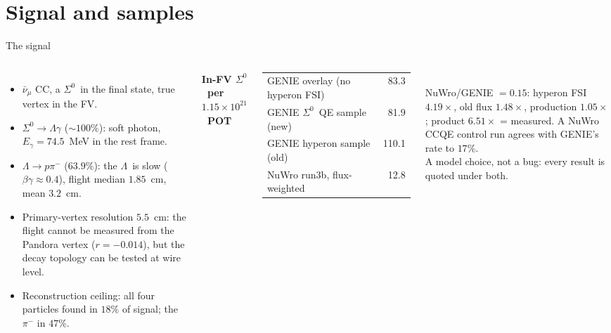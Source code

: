 \documentclass[aspectratio=169,10pt]{beamer}
\newcommand{\Szero}{\ensuremath{\Sigma^{0}}}
\newcommand{\Lam}{\ensuremath{\Lambda}}
\begin{document}
\section{Signal and samples}

\begin{frame}{The signal}
  \begin{columns}[T]
  \small
  \begin{itemize}
    \item $\bar\nu_\mu$ CC, a \Szero\ in the final state, true vertex in the FV.
    \item $\Szero\to\Lam\gamma$ ($\sim100\%$): soft photon,
          $E_\gamma = 74.5$~MeV in the rest frame.
    \item $\Lam\to p\pi^-$ ($63.9\%$): the \Lam\ is slow ($\beta\gamma\approx0.4$), flight
          median $1.85$~cm, mean $3.2$~cm.
    \item Primary-vertex resolution $5.5$~cm: the flight cannot be measured from the
          Pandora vertex ($r=-0.014$), but the decay topology can be tested at wire level.
    \item Reconstruction ceiling: all four particles found in $18\%$ of signal; the
          $\pi^-$ in $47\%$.
  \end{itemize}
  \footnotesize
  \textbf{In-FV \Szero\ per $1.15\times10^{21}$~POT}\\[2pt]
  \begin{tabular}{lr}
    \toprule
    GENIE overlay (no hyperon FSI) & 83.3 \\
    GENIE \Szero\ QE sample (new) & 81.9 \\
    GENIE hyperon sample (old) & 110.1 \\
    NuWro run3b, flux-weighted & 12.8 \\
    \bottomrule
  \end{tabular}\\[4pt]
  NuWro/GENIE $=0.15$: hyperon FSI $4.19\times$, old flux $1.48\times$, production
  $1.05\times$; product $6.51\times$ = measured. A NuWro CCQE control run agrees with
  GENIE's rate to $17\%$.\\[4pt]
  \alert{A model choice, not a bug}: every result is quoted under both.
  \end{columns}
\end{frame}
\end{document}
